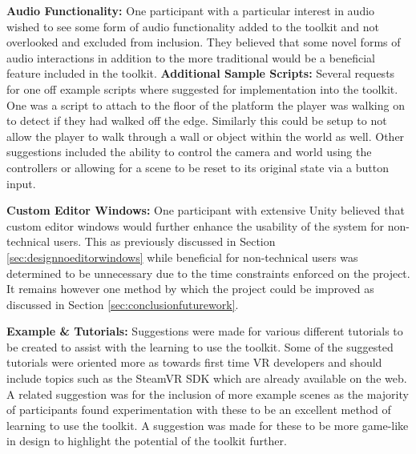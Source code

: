 \documentclass{l4proj}
\begin{document}
\textbf{Audio Functionality:} One participant with a particular interest in audio wished to see some form of audio functionality added to the toolkit and not overlooked and excluded from inclusion. They believed that some novel forms of audio interactions in addition to the more traditional would be a beneficial feature included in the toolkit. 
\textbf{Additional Sample Scripts:} Several requests for one off example scripts where suggested for implementation into the toolkit. One was a script to attach to the floor of the platform the player was walking on to detect if they had walked off the edge. Similarly this could be setup to not allow the player to walk through a wall or object within the world as well. Other suggestions included the ability to control the camera and world using the controllers or allowing for a scene to be reset to its original state via a button input. 

\textbf{Custom Editor Windows:} One participant with extensive Unity believed that custom editor windows would further enhance the usability of the system for non-technical users. This as previously discussed in Section \ref{sec:designnoeditorwindows} while beneficial for non-technical users was determined to be unnecessary due to the time constraints enforced on the project. It remains however one method by which the project could be improved as discussed in Section \ref{sec:conclusionfuturework}.

\textbf{Example \& Tutorials:} Suggestions were made for various different tutorials to be created to assist with the learning to use the toolkit. Some of the suggested tutorials were oriented more as towards first time VR developers and should include topics such as the SteamVR SDK which are already available on the web. A related suggestion was for the inclusion of more example scenes as the majority of participants found experimentation with these to be an excellent method of learning to use the toolkit. A suggestion was made for these to be more game-like in design to highlight the potential of the toolkit further. 
\end{document}
